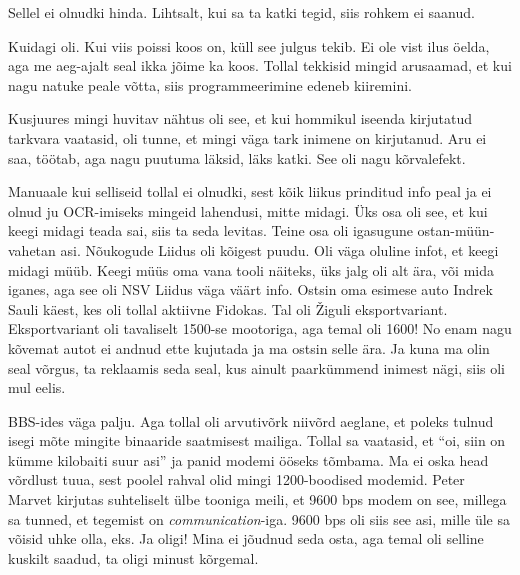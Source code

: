 
Sellel ei olnudki hinda. Lihtsalt, kui sa ta katki tegid, siis rohkem ei saanud.


Kuidagi oli. Kui viis poissi koos on, küll see julgus tekib. Ei ole vist ilus öelda, aga me aeg-ajalt seal ikka jõime ka koos. Tollal tekkisid mingid arusaamad, et kui nagu natuke peale võtta, siis programmeerimine edeneb kiiremini. 

Kusjuures mingi huvitav nähtus oli see, et kui hommikul iseenda kirjutatud tarkvara vaatasid, oli tunne, et mingi väga tark inimene on kirjutanud. Aru ei saa, töötab, aga nagu puutuma läksid, läks katki. See oli nagu  kõrvalefekt. 


Manuaale kui selliseid tollal ei olnudki, sest kõik liikus prinditud info peal ja ei olnud ju OCR-imiseks mingeid lahendusi, mitte midagi. Üks osa oli see, et kui keegi midagi teada sai, siis ta seda levitas. Teine osa oli igasugune ostan-müün-vahetan asi. Nõukogude Liidus oli kõigest puudu. Oli väga oluline infot, et keegi midagi müüb. Keegi müüs oma vana tooli näiteks, üks jalg oli alt ära, või mida iganes, aga see oli NSV Liidus väga väärt info. Ostsin oma esimese auto  Indrek Sauli käest, kes oli tollal aktiivne Fidokas. Tal oli  Žiguli eksportvariant. Eksportvariant oli tavaliselt 1500-se mootoriga, aga temal oli 1600! No enam nagu kõvemat autot ei andnud ette kujutada ja ma ostsin selle ära. Ja kuna ma olin seal võrgus, ta reklaamis seda seal, kus ainult paarkümmend inimest nägi, siis oli mul eelis.


BBS-ides väga palju. Aga tollal oli arvutivõrk niivõrd aeglane, et poleks tulnud isegi mõte mingite binaaride saatmisest mailiga. Tollal  sa vaatasid, et \enquote{oi, siin on kümme kilobaiti suur asi} ja  panid modemi ööseks tõmbama. Ma ei oska head võrdlust tuua, sest poolel rahval olid mingi 1200-boodised modemid. Peter Marvet kirjutas  suhteliselt ülbe tooniga meili, et  9600 bps modem on see, millega sa tunned, et tegemist on \emph{communication}-iga. 9600 bps oli siis see asi, mille üle sa võisid uhke olla, eks.  Ja oligi! Mina ei jõudnud seda osta, aga temal oli selline kuskilt saadud, ta oligi minust kõrgemal. 

